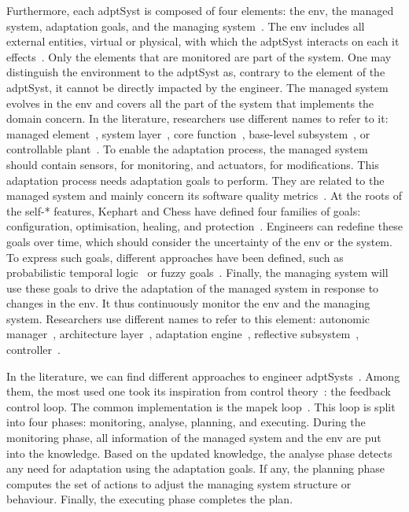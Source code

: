 Furthermore, each \gls{adptSyst} is composed of four elements: the \gls{env}, the managed system, adaptation goals, and the managing system~\cite{DBLP:books/sp/19/Weyns19}.
The \gls{env} includes all external entities, virtual or physical, with which the \gls{adptSyst} interacts on each it effects~\cite{DBLP:journals/ansoft/Jackson97}.
Only the elements that are monitored are part of the system.
One may distinguish the environment to the \gls{adptSyst} as, contrary to the element of the \gls{adptSyst}, it cannot be directly impacted by the engineer.
The managed system evolves in the \gls{env} and covers all the part of the system that implements the domain concern.
In the literature, researchers use different names to refer to it: managed element~\cite{DBLP:journals/computer/KephartC03}, system layer~\cite{DBLP:journals/computer/GarlanCHSS04}, core function~\cite{DBLP:journals/taas/SalehieT09}, base-level subsystem~\cite{DBLP:journals/taas/WeynsMA12}, or controllable plant~\cite{DBLP:conf/icse/FilieriHM14}.
To enable the adaptation process, the managed system should contain sensors, for monitoring, and actuators, for modifications.
This adaptation process needs adaptation goals to perform.
They are related to the managed system and mainly concern its software quality metrics~\cite{DBLP:conf/ecsa/WeynsA13}.
At the roots of the self-* features, Kephart and Chess have defined four families of goals: configuration, optimisation, healing, and protection~\cite{DBLP:journals/computer/KephartC03}.  
Engineers can redefine these goals over time, which should consider the uncertainty of the \gls{env} or the system.
To express such goals, different approaches have been defined, such as probabilistic temporal logic~\cite{DBLP:journals/tse/CalinescuGKMT11} or fuzzy goals~\cite{DBLP:conf/re/BaresiPS10}.
Finally, the managing system will use these goals to drive the adaptation of the managed system in response to changes in the \gls{env}.
It thus continuously monitor the \gls{env} and the managing system.
Researchers use different names to refer to this element: autonomic manager~\cite{DBLP:journals/computer/KephartC03}, architecture layer~\cite{DBLP:journals/computer/GarlanCHSS04}, adaptation engine~\cite{DBLP:journals/taas/SalehieT09}, reflective subsystem~\cite{DBLP:journals/taas/WeynsMA12}, controller~\cite{DBLP:conf/icse/FilieriHM14}.

In the literature, we can find different approaches to engineer \glspl{adptSyst}~\cite{DBLP:journals/computer/GarlanCHSS04}.
Among them, the most used one took its inspiration from control theory~\cite{DBLP:conf/dagstuhl/BrunSGGKLMPS09}: the feedback control loop.
The common implementation is the \gls{mapek} loop~\cite{DBLP:journals/computer/KephartC03, computing2006architectural}.
This loop is split into four phases: monitoring, analyse, planning, and executing.
During the monitoring phase, all information of the managed system and the \gls{env} are put into the knowledge.
Based on the updated knowledge, the analyse phase detects any need for adaptation using the adaptation goals.
If any, the planning phase computes the set of actions to adjust the managing system structure or behaviour.
Finally, the executing phase completes the plan.

